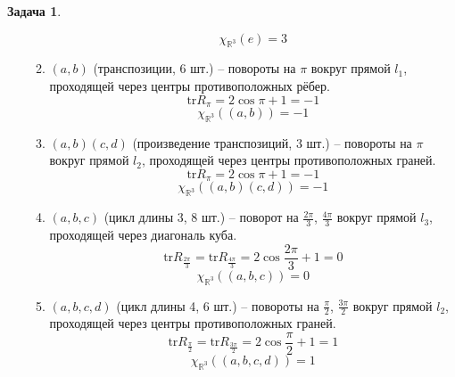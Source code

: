 \documentclass[12pt]{article}
\theoremstyle{definition}
\newtheorem{zad}{Задача}[section]
\begin{document}
\begin{zad}
\begin{itemize}
\begin{enumerate}
\begin{equation}
        \end{equation}
        \begin{equation}
            \boxed{\chi_{\mathbb{R}^3}(e)=3}
        \end{equation}
        \item $(a,b)$ (транспозиции, 6 шт.) -- повороты на $\pi$ вокруг прямой $l_1$, проходящей через центры противоположных рёбер.
        \begin{equation}
            \text{tr}R_\pi=2\cos \pi+1=-1
        \end{equation}
        \begin{equation}
            \boxed{\chi_{\mathbb{R}^3}((a,b))=-1}
        \end{equation}
        \item $(a,b)(c,d)$ (произведение транспозиций, 3 шт.) -- повороты на $\pi$ вокруг прямой $l_2$, проходящей через центры противоположных граней.
        \begin{equation}
            \text{tr}R_\pi=2\cos \pi+1=-1
        \end{equation}
        \begin{equation}
            \boxed{\chi_{\mathbb{R}^3}((a,b)(c,d))=-1}
        \end{equation}
        \item $(a,b,c)$ (цикл длины 3, 8 шт.) -- поворот на $\frac{2\pi}{3}$, $\frac{4\pi}{3}$ вокруг прямой $l_3$, проходящей через диагональ куба.
        \begin{equation}
            \text{tr}R_{\frac{2\pi}{3}}=\text{tr}R_{\frac{4\pi}{3}}=2\cos\frac{2\pi}{3}+1=0
        \end{equation}
        \begin{equation}
            \boxed{\chi_{\mathbb{R}^3}((a,b,c))=0}
        \end{equation}
        \item $(a,b,c,d)$ (цикл длины 4, 6 шт.) -- повороты на $\frac{\pi}{2}$, $\frac{3\pi}{2}$ вокруг прямой $l_2$, проходящей через центры противоположных граней.
        \begin{equation}
            \text{tr}R_{\frac{\pi}{2}}=\text{tr}R_{\frac{3\pi}{2}}=2\cos\frac{\pi}{2}+1=1
        \end{equation}
        \begin{equation}
            \boxed{\chi_{\mathbb{R}^3}((a,b,c,d))=1}
        \end{equation}
    \end{enumerate}
\end{itemize}
\end{zad}
\end{document}
